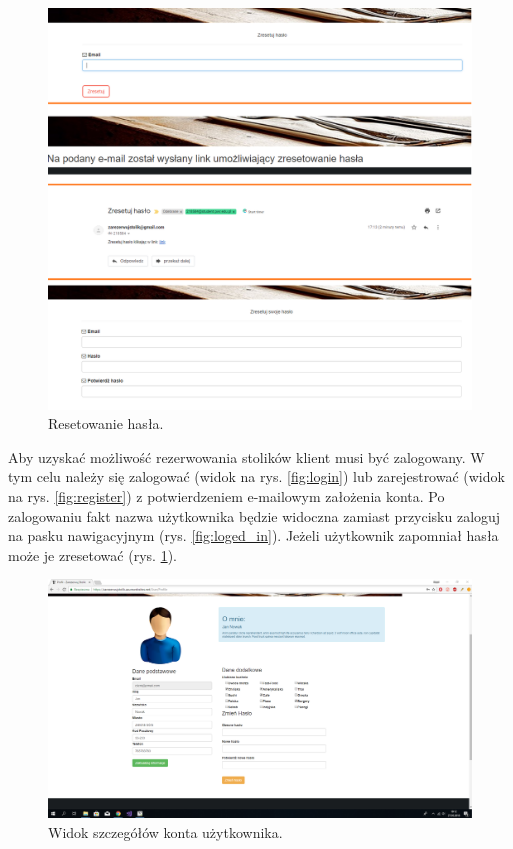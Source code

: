 \documentclass{article}
\begin{document}
\begin{figure}[H]
\centering
	\includegraphics[width=1.00\textwidth]{screens/reset.png}
	\caption{Resetowanie hasła.}
	\label{fig:reset}
\end{figure}

Aby uzyskać możliwość rezerwowania stolików klient musi być zalogowany. W tym celu należy się zalogować (widok na rys. \ref{fig:login}) lub zarejestrować (widok na rys. \ref{fig:register}) z potwierdzeniem e-mailowym założenia konta. Po zalogowaniu fakt nazwa użytkownika będzie widoczna zamiast przycisku zaloguj na pasku nawigacyjnym (rys. \ref{fig:loged_in}). Jeżeli użytkownik zapomniał hasła może je zresetować (rys. \ref{fig:reset}).

\begin{figure}[H]
\centering
	\includegraphics[width=1.00\textwidth]{screens/account_profile.png}
	\caption{Widok szczegółów konta użytkownika.}
	\label{fig:account_details}
\end{figure}
\end{document}
